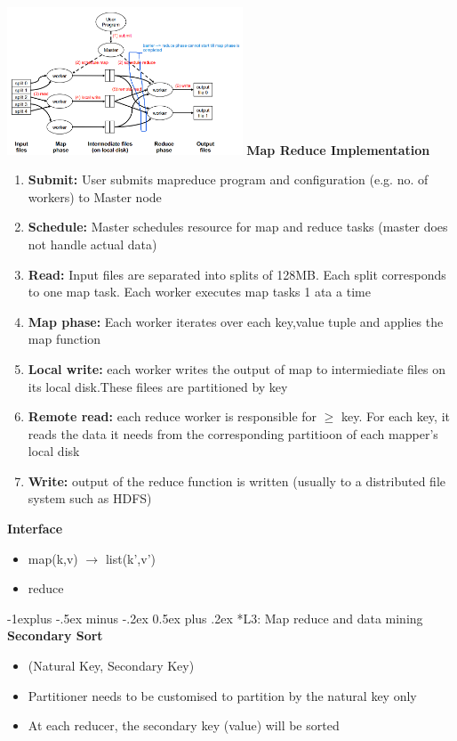 \documentclass[10pt, landscape]{article}
\makeatletter
\renewcommand{\subsection}{\@startsection{subsection}{2}{0mm}%
                                {-1explus -.5ex minus -.2ex}%
                                {0.5ex plus .2ex}%
                                {\normalfont\normalsize\bfseries}}
\makeatother
\begin{document}
\begin{multicols}{4}
\includegraphics*[width=7cm]{map_reduce_impl}
\textbf{Map Reduce Implementation}
\begin{enumerate}
  \item \textbf{Submit:} User submits mapreduce program and configuration (e.g. no. of workers) to Master node
  \item \textbf{Schedule:} Master schedules resource for map and reduce tasks (master does not handle actual data)
  \item \textbf{Read:} Input files are separated into splits of 128MB. Each split corresponds to one map task. Each worker executes map tasks 1 ata a time 
  \item \textbf{Map phase:} Each worker iterates over each key,value tuple and applies the map function 
  \item \textbf{Local write: } each worker writes the output of map to intermiediate files on its local disk.These filees are partitioned by key 
  \item \textbf{Remote read:} each reduce worker is responsible for $\geq$ key. For each key, it reads the data it needs from the corresponding partitioon of each mapper's local disk
  \item \textbf{Write: } output of the reduce function is written (usually to a distributed file system such as HDFS)
\end{enumerate}
  

\textbf{Interface}
\begin{itemize}
  \item map(k,v) $\rightarrow$ list(k',v')
  \item reduce 
\end{itemize}



\subsection*{L3: Map reduce and data mining}
\textbf{Secondary Sort}
\begin{itemize}
  \item (Natural Key, Secondary Key)
  \item Partitioner needs to be customised to partition by the natural key only 
  \item At each reducer, the secondary key (value) will be sorted
\end{itemize}


\end{multicols}
\end{document}
